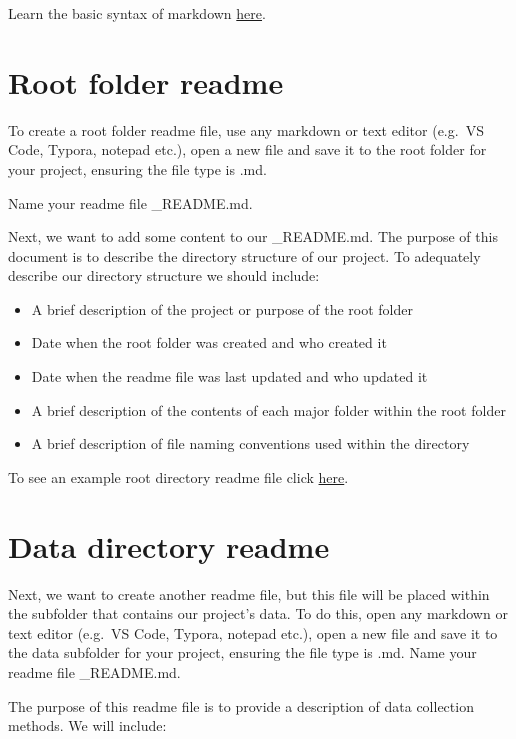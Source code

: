\documentclass[
]{book}
\providecommand{\tightlist}{%
  \setlength{\itemsep}{0pt}\setlength{\parskip}{0pt}}
\begin{document}
Learn the basic syntax of markdown \href{https://ubco-biology.github.io/Procedures-and-Guidelines/markdown-1.html}{here}.

\hypertarget{root-folder-readme}{%
\section{Root folder readme}\label{root-folder-readme}}

To create a root folder readme file, use any markdown or text editor (e.g.~VS Code, Typora, notepad etc.), open a new file and save it to the root folder for your project, ensuring the file type is .md.

Name your readme file \_README.md.

Next, we want to add some content to our \_README.md. The purpose of this document is to describe the directory structure of our project. To adequately describe our directory structure we should include:

\begin{itemize}
\tightlist
\item
  A brief description of the project or purpose of the root folder
\item
  Date when the root folder was created and who created it
\item
  Date when the readme file was last updated and who updated it
\item
  A brief description of the contents of each major folder within the root folder
\item
  A brief description of file naming conventions used within the directory
\end{itemize}

To see an example root directory readme file click \href{files/DS_rootREADME.md}{here}.

\hypertarget{data-directory-readme}{%
\section{Data directory readme}\label{data-directory-readme}}

Next, we want to create another readme file, but this file will be placed within the subfolder that contains our project's data. To do this, open any markdown or text editor (e.g.~VS Code, Typora, notepad etc.), open a new file and save it to the data subfolder for your project, ensuring the file type is .md. Name your readme file \_README.md.

The purpose of this readme file is to provide a description of data collection methods. We will include:
\end{document}
